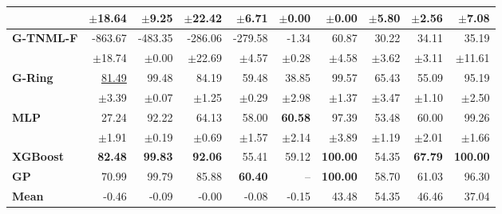 \begin{table}[!htbp]
\begin{tabular}{lrrrrr||rrrr}
 & $\pm$18.64 & $\pm$9.25 & $\pm$22.42 & $\pm$6.71 & $\pm$0.00 & $\pm$0.00 & $\pm$5.80 & $\pm$2.56 & $\pm$7.08 \\
\midrule
\textbf{G-TNML-F} & -863.67 & -483.35 & -286.06 & -279.58 & -1.34 & 60.87 & 30.22 & 34.11 & 35.19 \\
 & $\pm$18.74 & $\pm$0.00 & $\pm$22.69 & $\pm$4.57 & $\pm$0.28 & $\pm$4.58 & $\pm$3.62 & $\pm$3.11 & $\pm$11.61 \\
\midrule
\textbf{G-Ring} & \underline{81.49} & 99.48 & 84.19 & 59.48 & 38.85 & 99.57 & 65.43 & 55.09 & 95.19 \\
 & $\pm$3.39 & $\pm$0.07 & $\pm$1.25 & $\pm$0.29 & $\pm$2.98 & $\pm$1.37 & $\pm$3.47 & $\pm$1.10 & $\pm$2.50 \\
\midrule
\textbf{MLP} & 27.24 & 92.22 & 64.13 & 58.00 & \textbf{60.58} & 97.39 & 53.48 & 60.00 & 99.26 \\
 & $\pm$1.91 & $\pm$0.19 & $\pm$0.69 & $\pm$1.57 & $\pm$2.14 & $\pm$3.89 & $\pm$1.19 & $\pm$2.01 & $\pm$1.66 \\
\midrule
\textbf{XGBoost} & \textbf{82.48} & \textbf{99.83} & \textbf{92.06} & 55.41 & 59.12 & \textbf{100.00} & 54.35 & \textbf{67.79} & \textbf{100.00} \\
\midrule
\textbf{GP} & 70.99 & 99.79 & 85.88 & \textbf{60.40} & -- & \textbf{100.00} & 58.70 & 61.03 & 96.30 \\
\midrule
\textbf{Mean} & -0.46 & -0.09 & -0.00 & -0.08 & -0.15 & 43.48 & 54.35 & 46.46 & 37.04 \\
\bottomrule
\end{tabular}
\end{table}
